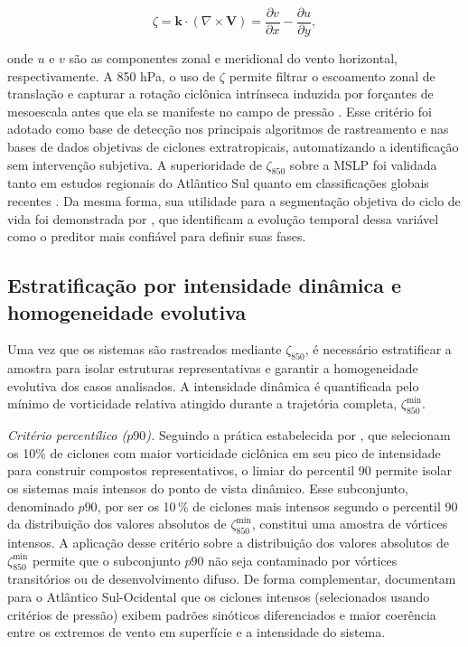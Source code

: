 \begin{equation}\label{eq:vorticidad_relativa}
\zeta = \mathbf{k} \cdot (\nabla \times \mathbf{V}) = \frac{\partial v}{\partial x} - \frac{\partial u}{\partial y},
\end{equation}

\noindent onde $u$ e $v$ são as componentes zonal e meridional do vento horizontal, respectivamente.
A 850 hPa, o uso de $\zeta$ permite filtrar o escoamento zonal de translação e capturar a rotação ciclônica intrínseca induzida por forçantes de mesoescala antes que ela se manifeste no campo de pressão \citep{hoskins2005new}.
Esse critério foi adotado como base de detecção nos principais algoritmos de rastreamento e nas bases de dados objetivas de ciclones extratropicais, automatizando a identificação sem intervenção subjetiva.
A superioridade de $\zeta_{850}$ sobre a MSLP foi validada tanto em estudos regionais do Atlântico Sul \citep{gramcianinov2019properties,padilhareinke2024objective} quanto em classificações globais recentes \citep{corner2025classification}. Da mesma forma, sua utilidade para a segmentação objetiva do ciclo de vida foi demonstrada por \citet{coutodesouza2024new}, que identificam a evolução temporal dessa variável como o preditor mais confiável para definir suas fases.

\subsection{Estratificação por intensidade dinâmica e homogeneidade evolutiva}\label{subsec:tb_poblaciones}

Uma vez que os sistemas são rastreados mediante $\zeta_{850}$, é necessário estratificar a amostra para isolar estruturas representativas e garantir a homogeneidade evolutiva dos casos analisados. A intensidade dinâmica é quantificada pelo mínimo de vorticidade relativa atingido durante a trajetória completa, $\zeta_{850}^{\min}$.

\textit{Critério percentílico ($p90$).} Seguindo a prática estabelecida por \citet{priestley2022improved}, que selecionam os 10\% de ciclones com maior vorticidade ciclônica em seu pico de intensidade para construir compostos representativos, o limiar do percentil 90 permite isolar os sistemas mais intensos do ponto de vista dinâmico.
Esse subconjunto, denominado $p90$, por ser os 10\,\% de ciclones mais intensos segundo o percentil 90 da distribuição dos valores absolutos de $\zeta_{850}^{\min}$, constitui uma amostra de vórtices intensos.
A aplicação desse critério sobre a distribuição dos valores absolutos de $\zeta_{850}^{\min}$ permite que o subconjunto $p90$ não seja contaminado por vórtices transitórios ou de desenvolvimento difuso.
De forma complementar, \citet{andrade2024composite} documentam para o Atlântico Sul-Ocidental que os ciclones intensos (selecionados usando critérios de pressão) exibem padrões sinóticos diferenciados e maior coerência entre os extremos de vento em superfície e a intensidade do sistema.

